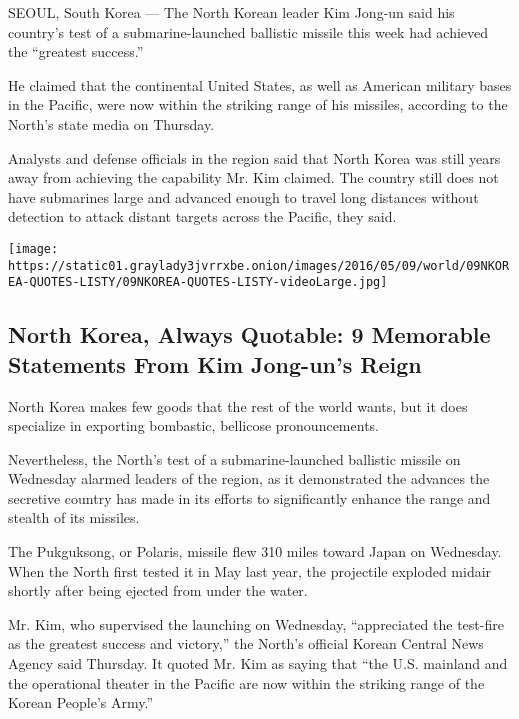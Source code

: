 SEOUL, South Korea --- The North Korean leader Kim Jong-un said his
country's test of a submarine-launched ballistic missile this week had
achieved the ``greatest success.''

He claimed that the continental United States, as well as American
military bases in the Pacific, were now within the striking range of his
missiles, according to the North's state media on Thursday.

Analysts and defense officials in the region said that North Korea was
still years away from achieving the capability Mr. Kim claimed. The
country still does not have submarines large and advanced enough to
travel long distances without detection to attack distant targets across
the Pacific, they said.

\href{https://www.nytimes3xbfgragh.onion/interactive/2016/world/asia/north-korea-kim-jong-un.html}{}

\texttt{[image: https://static01.graylady3jvrrxbe.onion/images/2016/05/09/world/09NKOREA-QUOTES-LISTY/09NKOREA-QUOTES-LISTY-videoLarge.jpg]}

\hypertarget{north-korea-always-quotable-9-memorable-statements-from-kim-jong-uns-reign}{%
\subsection{North Korea, Always Quotable: 9 Memorable Statements From
Kim Jong-un's
Reign}\label{north-korea-always-quotable-9-memorable-statements-from-kim-jong-uns-reign}}

North Korea makes few goods that the rest of the world wants, but it
does specialize in exporting bombastic, bellicose pronouncements.

Nevertheless, the North's test of a submarine-launched ballistic missile
on Wednesday alarmed leaders of the region, as it demonstrated the
advances the secretive country has made in its efforts to significantly
enhance the range and stealth of its missiles.

The Pukguksong, or Polaris, missile flew 310 miles toward Japan on
Wednesday. When the North first tested it in May last year, the
projectile exploded midair shortly after being ejected from under the
water.

Mr. Kim, who supervised the launching on Wednesday, ``appreciated the
test-fire as the greatest success and victory,'' the North's official
Korean Central News Agency said Thursday. It quoted Mr. Kim as saying
that ``the U.S. mainland and the operational theater in the Pacific are
now within the striking range of the Korean People's Army.''

